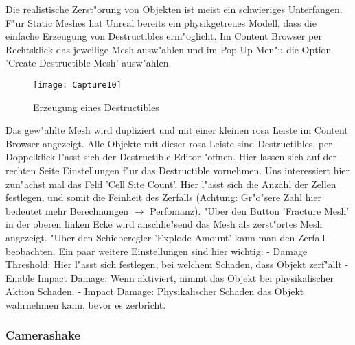 \documentclass[11pt, titlepage]{article}
\begin{document}
\noindent Die realistische Zerst"orung von Objekten ist meist ein schwieriges Unterfangen. F"ur Static Meshes hat Unreal bereits ein physikgetreues Modell, dass die einfache Erzeugung von Destructibles erm"oglicht. Im Content Browser per Rechtsklick das jeweilige Mesh ausw"ahlen und im Pop-Up-Men"u die Option 'Create Destructible-Mesh' ausw"ahlen. 

\begin{figure}[h]
\texttt{[image: Capture10]}
\caption{Erzeugung eines Destructibles}
\end{figure}


\noindent Das gew"ahlte Mesh wird dupliziert und mit einer kleinen rosa Leiste im Content Browser angezeigt. Alle Objekte mit dieser rosa Leiste sind Destructibles, per Doppelklick l"asst sich der Destructible Editor "offnen. \newline
\noindent Hier lassen sich auf der rechten Seite Einstellungen f"ur das Destructible vornehmen. Uns interessiert hier zun"achst mal das Feld 'Cell Site Count'. Hier l"asst sich die Anzahl der Zellen festlegen, und somit die Feinheit des Zerfalls (Achtung: Gr"o"sere Zahl hier bedeutet mehr Berechnungen $\rightarrow$ Perfomanz). "Uber den Button 'Fracture Mesh' in der oberen linken Ecke wird anschlie"send das Mesh als zerst"ortes Mesh angezeigt. "Uber den Schieberegler 'Explode Amount' kann man den Zerfall beobachten. \newline
\newline
\noindent Ein paar weitere Einstellungen sind hier wichtig: \newline
\noindent - Damage Threshold: Hier l"asst sich festlegen, bei welchem Schaden, dass Objekt zerf"allt \newline
\noindent - Enable Impact Damage: Wenn aktiviert, nimmt das Objekt bei physikalischer Aktion  Schaden. \newline
 \noindent- Impact Damage: Physikalischer Schaden das Objekt wahrnehmen kann, bevor es zerbricht. \newline

\subsubsection{Camerashake}
\end{document}
